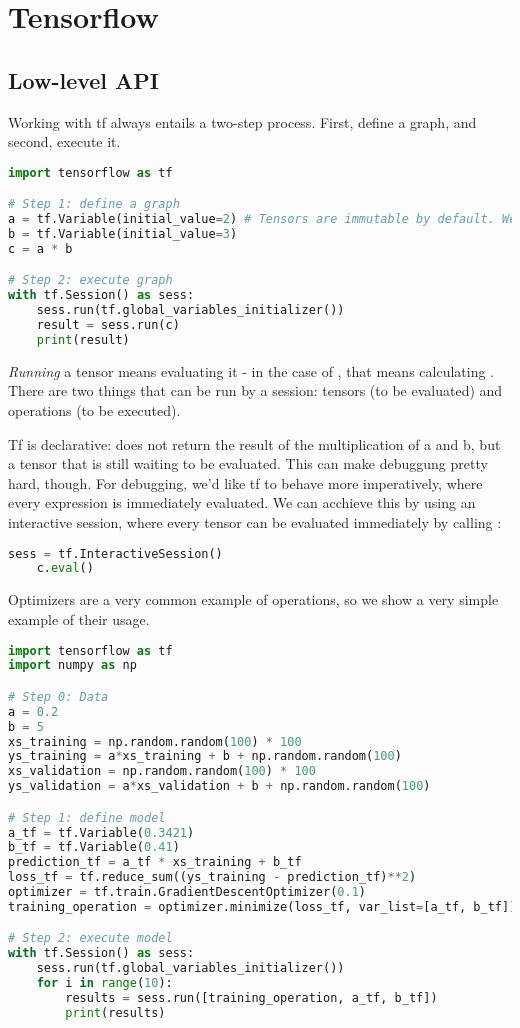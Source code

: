 \section{Tensorflow}

\subsection{Low-level API}

Working with tf always entails a two-step process. First, define a graph, and second, execute it. 

\begin{lstlisting}[language=python]
import tensorflow as tf

# Step 1: define a graph
a = tf.Variable(initial_value=2) # Tensors are immutable by default. We must wrap them in a Variable to allow them to change
b = tf.Variable(initial_value=3)
c = a * b

# Step 2: execute graph
with tf.Session() as sess:
    sess.run(tf.global_variables_initializer())
    result = sess.run(c)
    print(result)

\end{lstlisting}

\emph{Running} a tensor means evaluating it - in the case of , that means calculating .
There are two things that can be run by a session: tensors (to be evaluated) and operations (to be executed). 

Tf is declarative:  does not return the result of the multiplication of a and b, but a tensor that is still waiting to be evaluated. 
This can make debuggung pretty hard, though. For debugging, we'd like tf to behave more imperatively, where every expression is immediately evaluated. 
We can acchieve this by using an interactive session, where every tensor can be evaluated immediately by calling :
\begin{lstlisting}[language=python]
    sess = tf.InteractiveSession()
    c.eval()
\end{lstlisting}

Optimizers are a very common example of operations, so we show a very simple example of their usage.

\begin{lstlisting}[language=python]
import tensorflow as tf
import numpy as np

# Step 0: Data
a = 0.2
b = 5
xs_training = np.random.random(100) * 100
ys_training = a*xs_training + b + np.random.random(100)
xs_validation = np.random.random(100) * 100
ys_validation = a*xs_validation + b + np.random.random(100)

# Step 1: define model
a_tf = tf.Variable(0.3421)
b_tf = tf.Variable(0.41)
prediction_tf = a_tf * xs_training + b_tf
loss_tf = tf.reduce_sum((ys_training - prediction_tf)**2)
optimizer = tf.train.GradientDescentOptimizer(0.1)
training_operation = optimizer.minimize(loss_tf, var_list=[a_tf, b_tf])

# Step 2: execute model
with tf.Session() as sess:
    sess.run(tf.global_variables_initializer())
    for i in range(10):
        results = sess.run([training_operation, a_tf, b_tf])
        print(results)


\end{lstlisting}
